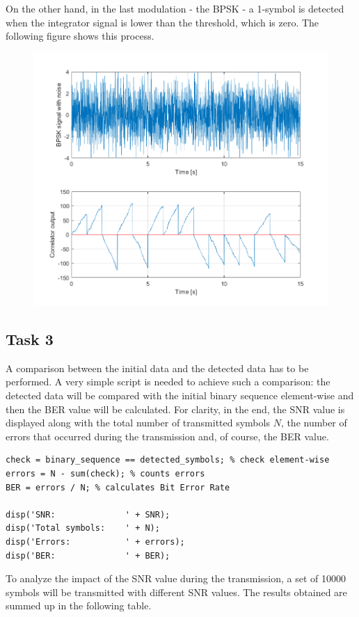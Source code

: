 \FloatBarrier\noindent On the other hand, in the last modulation - the BPSK - a 1-symbol is detected when the integrator signal is lower than the threshold, which is zero. The following figure shows this process.

\begin{figure}[h!]
    \centering
    \includegraphics[width = .7\textwidth]{lab-4/imgs/BPSK.png}
\end{figure}


\FloatBarrier

\subsection*{Task 3}
A comparison between the initial data and the detected data has to be performed. A very simple script is needed to achieve such a comparison: the detected data will be compared with the initial binary sequence element-wise and then the BER value will be calculated. For clarity, in the end, the SNR value is displayed along with the total number of transmitted symbols $N$, the number of errors that occurred during the transmission and, of course, the BER value.

\begin{lstlisting}
check = binary_sequence == detected_symbols; % check element-wise
errors = N - sum(check); % counts errors
BER = errors / N; % calculates Bit Error Rate

disp('SNR:              ' + SNR);
disp('Total symbols:    ' + N);
disp('Errors:           ' + errors);
disp('BER:              ' + BER);
\end{lstlisting}

\noindent To analyze the impact of the SNR value during the transmission, a set of 10000 symbols will be transmitted with different SNR values. The results obtained are summed up in the following table.

